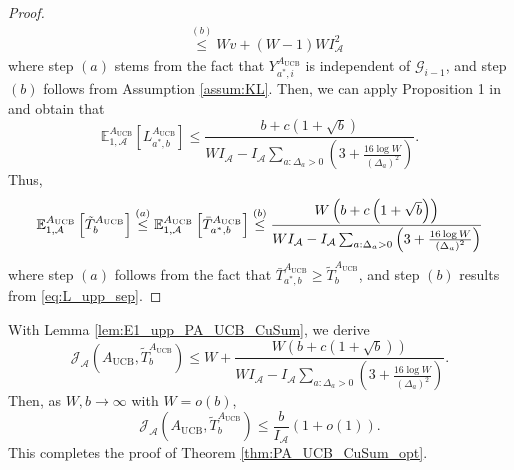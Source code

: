 \documentclass[letterpaper, 10 pt, conference]{ieeeconf}  %
\newcommand{\lp}{\left(}
\newcommand{\rp}{\right)}
\newcommand{\lb}{\left[}
\newcommand{\rb}{\right]}
\newcommand{\mcal}{\mathcal}
\newcommand{\mrm}{\mathrm}
\newcommand{\E}{\mathbb{E}}
\begin{document}
\begin{proof}
\begin{align}
    &\overset{(b)}{\leq} Wv + (W-1)WI_{\mcal{A}}^{2}
\end{align}
%
where step $(a)$ stems from the fact that $Y_{a^{*},i}^{A_{\mrm{UCB}}}$ is independent of $\mcal{G}_{i-1}$, and step $(b)$ follows from Assumption \ref{assum:KL}. Then, we can apply Proposition 1 in \cite{veeravalli2024quickest} and obtain that 
%
\begin{equation}\label{eq:L_upp_sep}
    \E_{1,\mcal{A}}^{A_{\mrm{UCB}}} \lb L_{a^{*},b}^{A_{\mrm{UCB}}} \rb \leq \frac{b + c \lp 1 + \sqrt{b} \rp}{WI_{\mcal{A}} -  I_{\mcal{A}}\sum_{a: \Delta_{a} > 0} \lp 3 + \frac{16 \log W}{\lp \Delta_{a} \rp^{2}} \rp}.
\end{equation}
%
Thus, 
%
\begin{equation}\label{eq:final_upp_sep}
    \E_{1,\mcal{A}}^{A_{\mrm{UCB}}} \lb \tilde{T}_{b}^{A_{\mrm{UCB}}} \rb \overset{(a)}{\leq} \E_{1,\mcal{A}}^{A_{\mrm{UCB}}} \lb \Bar{T}_{a^{*},b}^{A_{\mrm{UCB}}} \rb \overset{(b)}{\leq} \frac{W \lp b + c \lp 1 + \sqrt{b} \rp \rp}{WI_{\mcal{A}} - I_{\mcal{A}}\sum_{a: \Delta_{a} > 0} \lp 3 + \frac{16 \log W}{\lp \Delta_{a} \rp^{2}} \rp}
\end{equation}
%
where step $(a)$ follows from the fact that $\bar{T}_{a^{*},b}^{A_{\mrm{UCB}}} \geq \tilde{T}_{b}^{A_{\mrm{UCB}}}$, and step $(b)$ results from \eqref{eq:L_upp_sep}.
\end{proof}

With Lemma \ref{lem:E1_upp_PA_UCB_CuSum}, we derive
%
\begin{equation}
    \mcal{J}_{\mcal{A}} \lp A_{\mrm{UCB}}, \tilde{T}_{b}^{A_{\mrm{UCB}}} \rp \leq W + \frac{W \lp b + c \lp 1 + \sqrt{b} \rp \rp}{WI_{\mcal{A}} - I_{\mcal{A}}\sum_{a: \Delta_{a} > 0} \lp 3 + \frac{16 \log W}{\lp \Delta_{a} \rp^{2}} \rp}.
\end{equation}
%
Then, as $W, b \to \infty$ with $W = o(b)$,
%
\begin{equation}
     \mcal{J}_{\mcal{A}} \lp A_{\mrm{UCB}}, \tilde{T}_{b}^{A_{\mrm{UCB}}} \rp \leq \frac{b}{I_{\mcal{A}}} \lp 1 + o \lp 1 \rp \rp.
\end{equation}
%
This completes the proof of Theorem \ref{thm:PA_UCB_CuSum_opt}.
\end{document}
